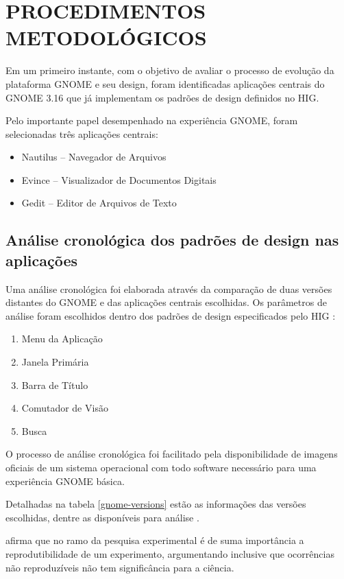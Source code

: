 \chapter{PROCEDIMENTOS METODOLÓGICOS}

Em um primeiro instante, com o objetivo de avaliar o processo de evolução da
plataforma GNOME e seu design, foram identificadas aplicações centrais do
GNOME 3.16 que já implementam os padrões de design definidos no HIG.

Pelo importante papel desempenhado na experiência GNOME, foram selecionadas três
aplicações centrais:

\begin{itemize}
    \item Nautilus -- Navegador de Arquivos
    \item Evince -- Visualizador de Documentos Digitais
    \item Gedit -- Editor de Arquivos de Texto
\end{itemize}

\section{Análise cronológica dos padrões de design nas aplicações}
\label{sec:chronologic-analysis}

Uma análise cronológica foi elaborada através da comparação de duas versões
distantes do GNOME e das aplicações centrais escolhidas. Os parâmetros de
análise foram escolhidos dentro dos padrões de design especificados pelo HIG
\cite{hig314patterns}:

\begin{enumerate}
  \item Menu da Aplicação
  \item Janela Primária
  \item Barra de Título
  \item Comutador de Visão
  \item Busca
\end{enumerate}

O processo de análise cronológica foi facilitado pela disponibilidade de imagens
oficiais de um sistema operacional com todo software necessário para uma
experiência GNOME básica.

Detalhadas na tabela \ref{gnome-versions} estão as informações das versões
escolhidas, dentre as disponíveis para análise \cite {gnome2015promo-usb}.

 afirma que no ramo da pesquisa experimental é de
suma importância a reprodutibilidade de um experimento, argumentando inclusive
que ocorrências não reproduzíveis não tem significância para a ciência.

